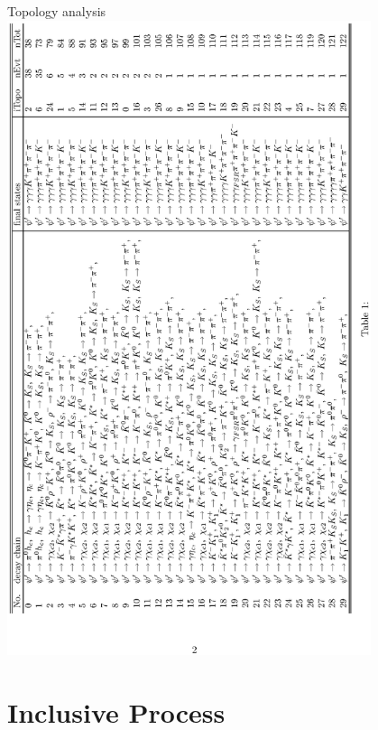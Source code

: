 \documentclass{beamer}
\begin{document}
\begin{frame}{Topology analysis}
\vskip -1.5cm
\includegraphics[width=0.8\textwidth, angle=270]{figures/notice.eps}
\end{frame}


\section{Inclusive Process}
\end{document}
